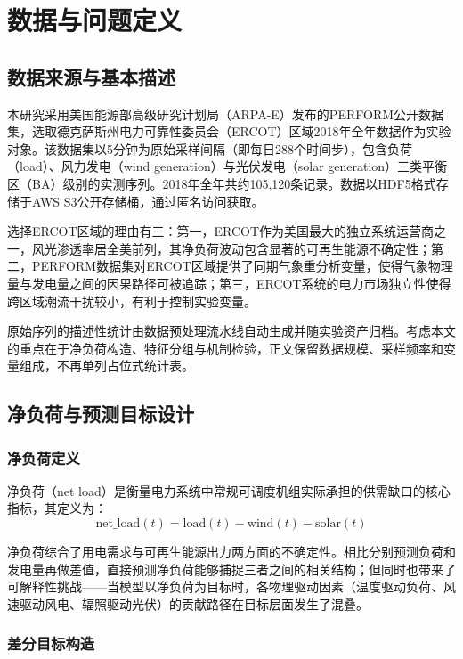 \chapter{数据与问题定义}

\section{数据来源与基本描述}

本研究采用美国能源部高级研究计划局（ARPA-E）发布的PERFORM公开数据集\cite{perform2023}，选取德克萨斯州电力可靠性委员会（ERCOT）区域2018年全年数据作为实验对象。该数据集以5分钟为原始采样间隔（即每日288个时间步），包含负荷（load）、风力发电（wind generation）与光伏发电（solar generation）三类平衡区（BA）级别的实测序列。2018年全年共约105,120条记录。数据以HDF5格式存储于AWS S3公开存储桶，通过匿名访问获取\cite{perform2023}。

选择ERCOT区域的理由有三：第一，ERCOT作为美国最大的独立系统运营商之一，风光渗透率居全美前列，其净负荷波动包含显著的可再生能源不确定性\cite{kaur2016net}；第二，PERFORM数据集对ERCOT区域提供了同期气象重分析变量，使得气象物理量与发电量之间的因果路径可被追踪；第三，ERCOT系统的电力市场独立性使得跨区域潮流干扰较小，有利于控制实验变量。

原始序列的描述性统计由数据预处理流水线自动生成并随实验资产归档。考虑本文的重点在于净负荷构造、特征分组与机制检验，正文保留数据规模、采样频率和变量组成，不再单列占位式统计表。

\section{净负荷与预测目标设计}

\subsection{净负荷定义}

净负荷（net load）是衡量电力系统中常规可调度机组实际承担的供需缺口的核心指标，其定义为：
\begin{equation}
\text{net\_load}(t) = \text{load}(t) - \text{wind}(t) - \text{solar}(t)
\end{equation}

净负荷综合了用电需求与可再生能源出力两方面的不确定性。相比分别预测负荷和发电量再做差值，直接预测净负荷能够捕捉三者之间的相关结构；但同时也带来了可解释性挑战——当模型以净负荷为目标时，各物理驱动因素（温度驱动负荷、风速驱动风电、辐照驱动光伏）的贡献路径在目标层面发生了混叠。

\subsection{差分目标构造}

